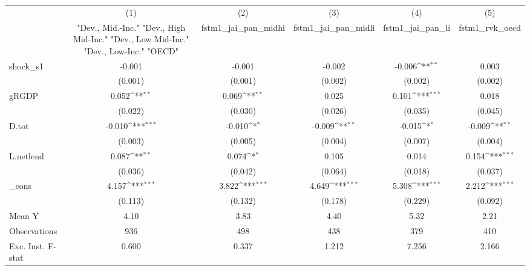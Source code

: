 {
\def\sym#1{\ifmmode^{#1}\else\(^{#1}\)\fi}
\begin{tabular}{l*{5}{c}}
\toprule
            &\multicolumn{1}{c}{(1)}&\multicolumn{1}{c}{(2)}&\multicolumn{1}{c}{(3)}&\multicolumn{1}{c}{(4)}&\multicolumn{1}{c}{(5)}\\
            &\multicolumn{1}{c}{ "Dev., Mid.-Inc." "Dev., High Mid-Inc." "Dev., Low Mid-Inc." "Dev., Low-Inc." "OECD" }&\multicolumn{1}{c}{fstm1\_jai\_pan\_midhi}&\multicolumn{1}{c}{fstm1\_jai\_pan\_midli}&\multicolumn{1}{c}{fstm1\_jai\_pan\_li}&\multicolumn{1}{c}{fstm1\_rvk\_oecd}\\
\midrule
shock\_s1    &      -0.001         &      -0.001         &      -0.002         &      -0.006\sym{**} &       0.003         \\
            &     (0.001)         &     (0.001)         &     (0.002)         &     (0.002)         &     (0.002)         \\
\addlinespace
gRGDP       &       0.052\sym{**} &       0.069\sym{**} &       0.025         &       0.101\sym{***}&       0.018         \\
            &     (0.022)         &     (0.030)         &     (0.026)         &     (0.035)         &     (0.045)         \\
\addlinespace
D.tot       &      -0.010\sym{***}&      -0.010\sym{*}  &      -0.009\sym{**} &      -0.015\sym{*}  &      -0.009\sym{**} \\
            &     (0.003)         &     (0.005)         &     (0.004)         &     (0.007)         &     (0.004)         \\
\addlinespace
L.netlend   &       0.087\sym{**} &       0.074\sym{*}  &       0.105         &       0.014         &       0.154\sym{***}\\
            &     (0.036)         &     (0.042)         &     (0.064)         &     (0.018)         &     (0.037)         \\
\addlinespace
\_cons      &       4.157\sym{***}&       3.822\sym{***}&       4.649\sym{***}&       5.308\sym{***}&       2.212\sym{***}\\
            &     (0.113)         &     (0.132)         &     (0.178)         &     (0.229)         &     (0.092)         \\
\midrule
Mean Y      &        4.10         &        3.83         &        4.40         &        5.32         &        2.21         \\
Observations&         936         &         498         &         438         &         379         &         410         \\
Exc. Inst. F-stat&       0.600         &       0.337         &       1.212         &       7.256         &       2.166         \\
\bottomrule
\end{tabular}
}
